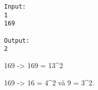 \begin{verbatim}
Input:
1
169

Output:
2
\end{verbatim}

169 -> 169 = 13^2


169 -> 16 = 4^2 và 9 = 3^2.